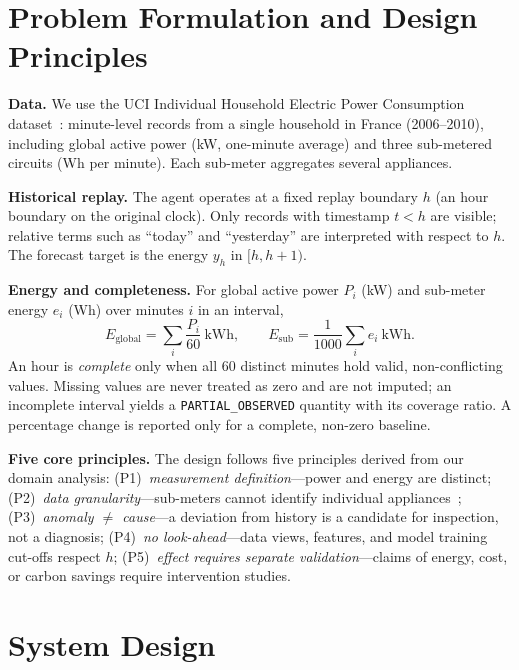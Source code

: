 \documentclass[conference]{IEEEtran}
\begin{document}
\section{Problem Formulation and Design Principles}
\label{sec:problem}

\textbf{Data.} We use the UCI Individual Household Electric Power
Consumption dataset~\cite{hebrail2006uci}: minute-level records from a
single household in France (2006--2010), including global active power
(kW, one-minute average) and three sub-metered circuits (Wh per
minute). Each sub-meter aggregates several appliances.

\textbf{Historical replay.} The agent operates at a fixed replay
boundary $h$ (an hour boundary on the original clock). Only records
with timestamp $t<h$ are visible; relative terms such as ``today'' and
``yesterday'' are interpreted with respect to $h$. The forecast target
is the energy $y_h$ in $[h, h+1)$.

\textbf{Energy and completeness.} For global active power $P_i$ (kW)
and sub-meter energy $e_i$ (Wh) over minutes $i$ in an interval,
\begin{equation}
E_{\text{global}} = \sum_i \frac{P_i}{60}\ \text{kWh},\qquad
E_{\text{sub}} = \frac{1}{1000}\sum_i e_i\ \text{kWh}.
\end{equation}
An hour is \emph{complete} only when all 60 distinct minutes hold valid,
non-conflicting values. Missing values are never treated as zero and are
not imputed; an incomplete interval yields a \texttt{PARTIAL\_OBSERVED}
quantity with its coverage ratio. A percentage change is reported only
for a complete, non-zero baseline.

\textbf{Five core principles.} The design follows five principles
derived from our domain analysis:
(P1)~\emph{measurement definition}---power and energy are distinct;
(P2)~\emph{data granularity}---sub-meters cannot identify individual
appliances~\cite{hart1992nilm};
(P3)~\emph{anomaly $\neq$ cause}---a deviation from history is a
candidate for inspection, not a diagnosis;
(P4)~\emph{no look-ahead}---data views, features, and model training
cut-offs respect $h$;
(P5)~\emph{effect requires separate validation}---claims of energy,
cost, or carbon savings require intervention studies.

\section{System Design}
\label{sec:design}
\end{document}
